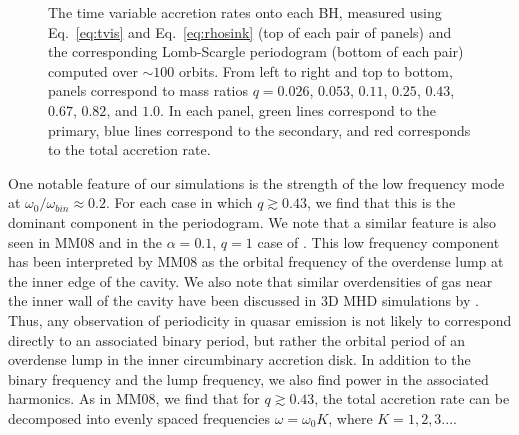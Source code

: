 \documentclass[apj]{emulateapj}
\begin{document}
\begin{figure}
\caption{The time variable accretion rates onto each BH, measured using Eq.~\ref{eq:tvis} and Eq.~\ref{eq:rhosink} (top of each pair of panels) and the corresponding Lomb-Scargle periodogram (bottom of each pair) computed over $\sim 100$ orbits. From left to right and top to bottom, panels correspond to mass ratios $q=0.026$, $0.053$, $0.11$, $0.25$, $0.43$, $0.67$, $0.82$, and $1.0$. In each panel, green lines correspond to the primary, blue lines correspond to the secondary, and red corresponds to the total accretion rate.}
\label{fig:periodogram}
\end{figure}

One notable feature of our simulations is the strength of the low frequency mode at $\omega_0 /\omega_{bin}\approx 0.2$. For each case in which $q \gtrsim 0.43$, we find that this is the dominant component in the periodogram. We note that a similar feature is also seen in MM08 and in the $\alpha=0.1$, $q=1$ case of \citet{dorazio13}. This low frequency component has been interpreted by MM08 as the orbital frequency of the overdense lump at the inner edge of the cavity. We also note that similar overdensities of gas near the inner wall of the cavity have been discussed in 3D MHD simulations by \citep{noble12,shi12}. Thus, any observation of periodicity in quasar emission is not likely to correspond directly to an associated binary period, but rather the orbital period of an overdense lump in the inner circumbinary accretion disk. In addition to the binary frequency and the lump frequency, we also find power in the associated harmonics. As in MM08, we find that for $q \gtrsim 0.43$, the total accretion rate can be decomposed into evenly spaced frequencies $\omega = \omega_0 K$, where $K = 1,2,3...$.
\end{document}
